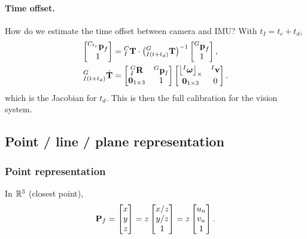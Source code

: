 \paragraph{Time offset.} How do we estimate the time offset between camera and IMU? With $t_I = t_c + t_d$,
\begin{align}
\begin{bmatrix} {}^{C_{t_c}}\boldsymbol{\mathbf{p}}_f \\ 1 \end{bmatrix} &= {}^{C}_{I}\boldsymbol{\mathbf{T}}\cdot\big({}^{G}_{I(t+t_d)}\boldsymbol{\mathbf{T}}\big)^{-1}\begin{bmatrix} {}^{G}\boldsymbol{\mathbf{p}}_f \\ 1 \end{bmatrix}, \\
{}^{G}_{I(t+t_d)}\dot{\boldsymbol{\mathbf{T}}} &= \begin{bmatrix} {}^{G}_{I}\boldsymbol{\mathbf{R}} & {}^{G}\boldsymbol{\mathbf{p}}_I \\ \boldsymbol{\mathbf{0}}_{1\times3} & 1 \end{bmatrix}\begin{bmatrix} \left\lfloor{}^{I}\boldsymbol{\mathbf{\omega}}\right\rfloor_{\times} & {}^{I}\boldsymbol{\mathbf{v}} \\ \boldsymbol{\mathbf{0}}_{1\times3} & 0 \end{bmatrix}.
\end{align}
which is the Jacobian for $t_d$. This is then the full calibration for the vision system.

\subsection{Point / line / plane representation}

\subsubsection*{Point representation}
In $\mathbb{R}^{3}$ (closest point),
\begin{align}
\boldsymbol{\mathbf{P}}_f = \begin{bmatrix} x \\ y \\ z \end{bmatrix} = z\begin{bmatrix} x/z \\ y/z \\ 1 \end{bmatrix} = z\begin{bmatrix} u_n \\ v_n \\ 1 \end{bmatrix}.
\end{align}
